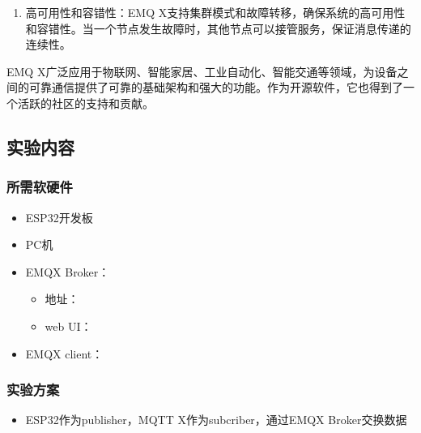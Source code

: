 \documentclass[a4paper,12pt,english]{sphinxmanual}
\begin{document}
{{\begin{enumerate}
\item {} 
\sphinxAtStartPar
高可用性和容错性：EMQ X支持集群模式和故障转移，确保系统的高可用性和容错性。当一个节点发生故障时，其他节点可以接管服务，保证消息传递的连续性。

\end{enumerate}

\sphinxAtStartPar
EMQ X广泛应用于物联网、智能家居、工业自动化、智能交通等领域，为设备之间的可靠通信提供了可靠的基础架构和强大的功能。作为开源软件，它也得到了一个活跃的社区的支持和贡献。


\subsection{实验内容}
\label{\detokenize{exp-esp32/mqtt:id2}}

\subsubsection{所需软硬件}
\label{\detokenize{exp-esp32/mqtt:id3}}\begin{itemize}
\item {} 
\sphinxAtStartPar
ESP32开发板

\item {} 
\sphinxAtStartPar
PC机

\item {} 
\sphinxAtStartPar
EMQX Broker：
\begin{itemize}
\item {} 
\sphinxAtStartPar
地址：

\item {} 
\sphinxAtStartPar
web UI：

\end{itemize}

\item {} 
\sphinxAtStartPar
EMQX client：

\end{itemize}


\subsubsection{实验方案}
\label{\detokenize{exp-esp32/mqtt:id4}}\begin{itemize}
\item {} 
\sphinxAtStartPar
ESP32作为publisher，MQTT X作为subcriber，通过EMQX Broker交换数据


\end{itemize}}}
\end{document}

